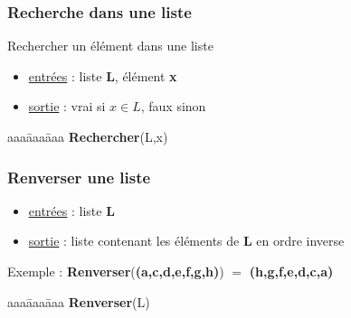 \begin{frame}
  \frametitle{Recherche dans une liste}
  Rechercher un élément dans une liste
  \begin{itemize}
  \item[] \underline{entrées} : liste \textbf{L}, élément \textbf{x}
  \item[] \underline{sortie} : vrai si $x \in L$, faux sinon
  \end{itemize}

  \begin{tabbing}
    aaa\=aaa\=aaa\kill
    \textbf{Rechercher}(L,x) \\
  \end{tabbing}

\end{frame}

\begin{frame}
  \frametitle{Renverser une liste}
    \begin{itemize}
    \item[] \underline{entrées} : liste \textbf{L}
    \item[] \underline{sortie} :  liste contenant les éléments de \textbf{L} en ordre inverse
    \end{itemize}
    Exemple : \textbf{Renverser}(\textbf{(a,c,d,e,f,g,h)}) $ = $ \textbf{(h,g,f,e,d,c,a)}
    
  \begin{tabbing}
    aaa\=aaa\=aaa\kill
    \textbf{Renverser}(L) \\
  \end{tabbing}

\end{frame}

